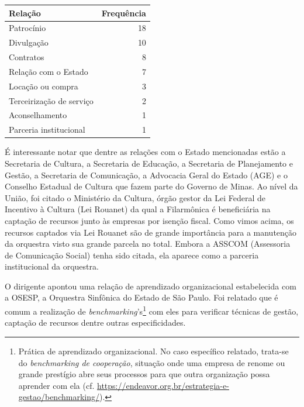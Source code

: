 \documentclass[a4paper, 12pt, openright, oneside, german, french, english, brazil]{abntex2}
\begin{document}
	
	\begin{table}[!h]
		{\begin{tabular}{lr}
			\hline
			\textbf{Relação} & \textbf{Frequência} \\ 
			\hline
			Patrocínio &  18 \\ 
			Divulgação &  10 \\ 
			Contratos &   8 \\ 
			Relação com o Estado &   7 \\ 
			Locação ou compra &   3 \\ 
			Terceirização de serviço &   2 \\ 
			Aconselhamento &   1 \\ 
			Parceria institucional &   1 \\ 
			\hline
		\end{tabular}
	}
	{}
	\end{table}

	É interessante notar que dentre as relações com o Estado mencionadas estão a Secretaria de Cultura, a Secretaria de Educação, a Secretaria de Planejamento e Gestão, a Secretaria de Comunicação, a Advocacia Geral do Estado (AGE) e o Conselho Estadual de Cultura que fazem parte do Governo de Minas. Ao nível da União, foi citado o Ministério da Cultura, órgão gestor da Lei Federal de Incentivo à Cultura (Lei Rouanet) da qual a Filarmônica é beneficiária na captação de recursos junto às empresas por isenção fiscal. Como vimos acima, os recursos captados via Lei Rouanet são de grande importância para a manutenção da orquestra visto sua grande parcela no total. Embora a ASSCOM (Assessoria de Comunicação Social) tenha sido citada, ela aparece como a parceria institucional da orquestra.
	
	O dirigente apontou uma relação de aprendizado organizacional estabelecida com a OSESP, a Orquestra Sinfônica do Estado de São Paulo. Foi relatado que é comum a realização de \textit{benchmarking}'s\footnote{Prática de aprendizado organizacional. No caso específico relatado, trata-se do \textit{benchmarking de cooperação}, situação onde uma empresa de renome ou grande prestígio abre seus processos para que outra organização possa aprender com ela (cf. \url{https://endeavor.org.br/estrategia-e-gestao/benchmarking/}).} com eles para verificar técnicas de gestão, captação de recursos dentre outras especificidades.
	
\end{document}
